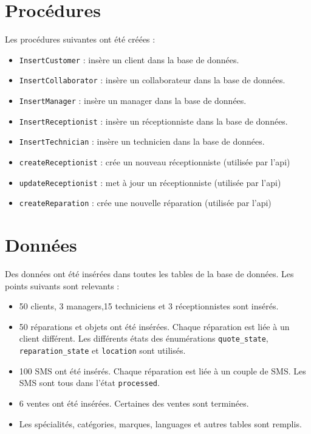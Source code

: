 \documentclass{article}
\newcommand{\ttt}{\texttt}
\begin{document}
    \pagebreak

    \section{Procédures}

    Les procédures suivantes ont été créées :
    \begin{itemize}
        \item \ttt{InsertCustomer} : insère un client dans la base de données.
        \item \ttt{InsertCollaborator} : insère un collaborateur dans la base de données.
        \item \ttt{InsertManager} : insère un manager dans la base de données.
        \item \ttt{InsertReceptionist} : insère un réceptionniste dans la base de données.
        \item \ttt{InsertTechnician} : insère un technicien dans la base de données.
        \item \ttt{createReceptionist} : crée un nouveau réceptionniste (utilisée par l'api)
        \item \ttt{updateReceptionist} : met à jour un réceptionniste (utilisée par l'api)
        \item \ttt{createReparation} : crée une nouvelle réparation (utilisée par l'api)
    \end{itemize}


    \section{Données}

    Des données ont été insérées dans toutes les tables de la base de données. Les points suivants sont relevants :
    \begin{itemize}
        \item 50 clients, 3 managers,15 techniciens et 3 réceptionnistes sont insérés.
        \item 50 réparations et objets ont été insérées. Chaque réparation est liée à un client différent. Les différents états des énumérations \ttt{quote\_state}, \ttt{reparation\_state} et \ttt{location} sont utilisés.
        \item 100 SMS ont été insérés. Chaque réparation est liée à un couple de SMS. Les SMS sont tous dans l'état \ttt{processed}.
        \item 6 ventes ont été insérées. Certaines des ventes sont terminées.
        \item Les spécialités, catégories, marques, languages et autres tables sont remplis.
    \end{itemize}
\end{document}
